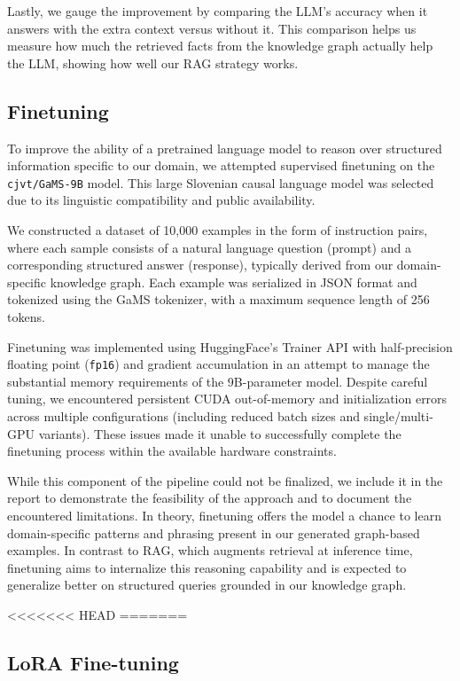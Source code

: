 \documentclass[fleqn,moreauthors,10pt]{ds_report}
\begin{document}
Lastly, we gauge the improvement by comparing the LLM's accuracy when it answers with the extra context versus without it. This comparison helps us measure how much the retrieved facts from the knowledge graph actually help the LLM, showing how well our RAG strategy works.

\subsection*{Finetuning}

To improve the ability of a pretrained language model to reason over structured information specific to our domain, we attempted supervised finetuning on the \texttt{cjvt/GaMS-9B} model. This large Slovenian causal language model was selected due to its linguistic compatibility and public availability.

We constructed a dataset of 10{,}000 examples in the form of instruction pairs, where each sample consists of a natural language question (prompt) and a corresponding structured answer (response), typically derived from our domain-specific knowledge graph. Each example was serialized in JSON format and tokenized using the GaMS tokenizer, with a maximum sequence length of 256 tokens.

Finetuning was implemented using HuggingFace’s Trainer API with half-precision floating point (\texttt{fp16}) and gradient accumulation in an attempt to manage the substantial memory requirements of the 9B-parameter model. Despite careful tuning, we encountered persistent CUDA out-of-memory and initialization errors across multiple configurations (including reduced batch sizes and single/multi-GPU variants). These issues made it unable to successfully complete the finetuning process within the available hardware constraints.

While this component of the pipeline could not be finalized, we include it in the report to demonstrate the feasibility of the approach and to document the encountered limitations. In theory, finetuning offers the model a chance to learn domain-specific patterns and phrasing present in our generated graph-based examples. In contrast to RAG, which augments retrieval at inference time, finetuning aims to internalize this reasoning capability and is expected to generalize better on structured queries grounded in our knowledge graph.

<<<<<<< HEAD
=======
\subsection*{LoRA Fine-tuning}
\end{document}
